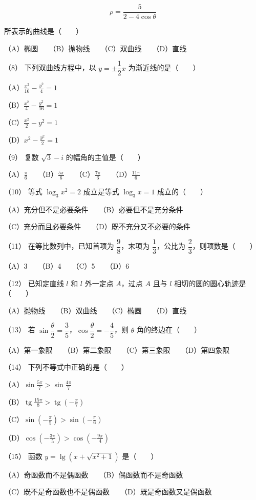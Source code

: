 \begin{question}
\nopagebreak[4]
\[
\rho=\frac5{2-4\cos\theta}
\]

所表示的曲线是\mbox{（　　）}

（A）椭圆　　（B）抛物线　　（C）双曲线　　（D）直线

（8） 下列双曲线方程中，以 $y=\pm\dfrac12x$ 为渐近线的是\mbox{（　　）}

（A）$\frac{x^2}{16}-\frac{y^2}{4}=1$

（B）$\frac{x^2}{4}-\frac{y^2}{16}=1$

（C）$\frac{x^2}{2}-y^2=1$

（D）$x^2-\frac{y^2}{2}=1$

（9） 复数 $\sqrt3-i$ 的幅角的主值是\mbox{（　　）}

（A）$\frac\pi6$　　（B）$\frac{5\pi}6$　　（C）$\frac{7\pi}6$　　（D）$\frac{11\pi}6$

（10） 等式 $\log_3x^2=2$ 成立是等式 $\log_3x=1$ 成立的\mbox{（　　）}

（A）充分但不是必要条件　　（B）必要但不是充分条件

（C）充分而且必要条件　　（D）既不充分又不必要的条件

（11） 在等比数列中，已知首项为 $\dfrac98$，末项为 $\dfrac13$，公比为 $\dfrac23$，则项数是\mbox{（　　）}

（A）3　　（B）4　　（C）5　　（D）6

（12） 已知定直线 $l$ 和 $l$ 外一定点 $A$，过点 $A$ 且与 $l$ 相切的圆的圆心轨迹是\mbox{（　　）}

（A）抛物线　　（B）双曲线　　（C）椭圆　　（D）直线

（13） 若 $\sin\dfrac\theta2=\dfrac35$，$\cos\dfrac\theta2=-\dfrac45$，则 $\theta$ 角的终边在\mbox{（　　）}

（A）第一象限　　（B）第二象限　　（C）第三象限　　（D）第四象限

（14） 下列不等式中正确的是\mbox{（　　）}

（A）$\sin\frac{5\pi}7>\sin\frac{4\pi}7$

（B）$\operatorname{tg}\frac{15\pi}8>\operatorname{tg}\left(-\frac\pi7\right)$

（C）$\sin\left(-\frac\pi5\right)>\sin\left(-\frac\pi6\right)$

（D）$\cos\left(-\frac{3\pi}5\right)>\cos\left(-\frac{9\pi}4\right)$

（15） 函数 $y=\lg\left(x+\sqrt{x^2+1}\right)$ 是\mbox{（　　）}

（A）奇函数而不是偶函数　　（B）偶函数而不是奇函数

（C）既不是奇函数也不是偶函数　　（D）既是奇函数又是偶函数


\end{question}
